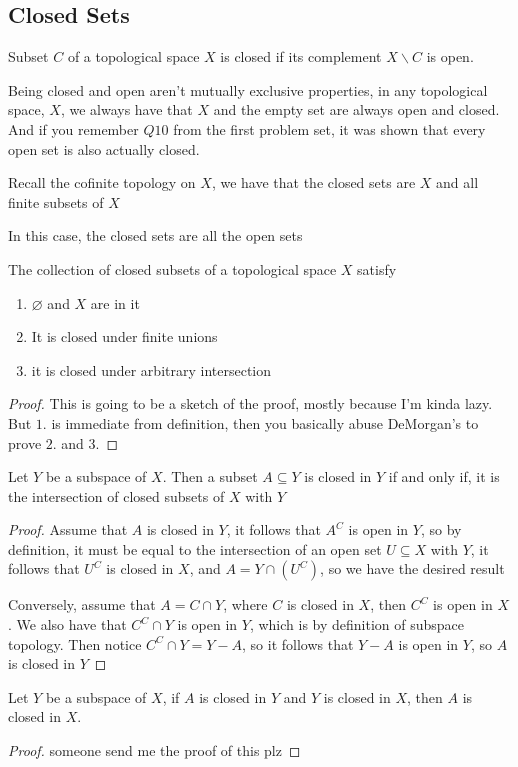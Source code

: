 \subsection{Closed Sets}
\begin{definition}
    Subset $C$ of a topological space $X$ is closed if its complement $X\backslash C$ is open.
\end{definition}
\begin{remark}
    Being closed and open aren't mutually exclusive properties, in any topological space, $X$, we always have that $X$ and the empty set are always open and closed. And if you remember $Q10$ from the first problem set, it was shown that every open set is also actually closed.
\end{remark}
\begin{example}
Recall the cofinite topology on $X$, we have that the closed sets are $X$ and all finite subsets of $X$
\end{example}
\begin{example}
    In this case, the closed sets are all the open sets
\end{example}
\begin{theorem}
    The collection of closed subsets of a topological space $X$ satisfy
    \begin{enumerate}
        \item $\varnothing$ and $X$ are in it
        \item It is closed under finite unions
        \item it is closed under arbitrary intersection
    \end{enumerate}
\end{theorem}
\begin{proof}
    This is going to be a sketch of the proof, mostly because I'm kinda lazy. But $1.$ is immediate from definition, then you basically abuse DeMorgan's to prove $2.$ and $3.$
\end{proof}
\begin{proposition}
    Let $Y$ be a subspace of $X$. Then a subset $A\subseteq Y$ is closed in $Y$ if and only if, it is the intersection of closed subsets of $X$ with $Y$
\end{proposition}
\begin{proof}
    Assume that $A$ is closed in $Y$, it follows that $A^C$ is open in $Y$, so by definition, it must be equal to the intersection of an open set $U\subseteq X$ with $Y$, it follows that $U^C$ is closed in $X$, and $A=Y\cap(U^C)$, so we have the desired result

    Conversely, assume that $A=C\cap Y$, where $C$ is closed in $X$, then $C^C$ is open in $X$. We also have that $C^C\cap Y$ is open in $Y$, which is by definition of subspace topology. Then notice $C^C\cap Y = Y-A$, so it follows that $Y-A$ is open in $Y$, so $A$ is closed in $Y$
\end{proof}
\begin{proposition}
    Let $Y$ be a subspace of $X$, if $A$ is closed in $Y$ and $Y$ is closed in $X$, then $A$ is closed in $X$. 
\end{proposition}
\begin{proof}
    someone send me the proof of this plz
\end{proof}
